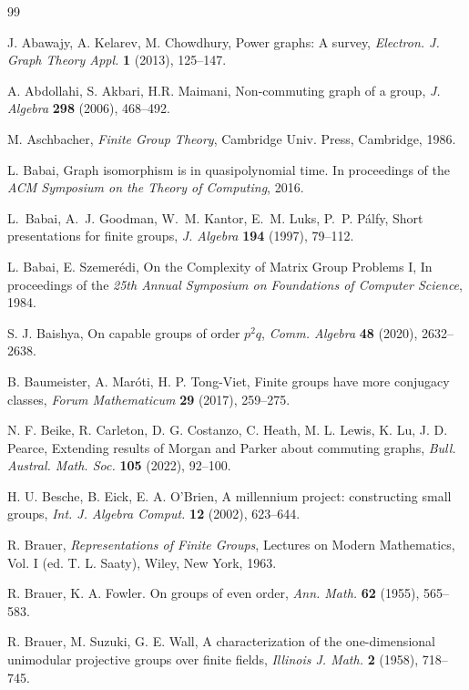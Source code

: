 \documentclass{elsarticle}
\begin{document}
\begin{thebibliography}{99}

J. Abawajy, A. Kelarev, M. Chowdhury,
Power graphs: A survey,
\textit{Electron. J. Graph Theory Appl.} \textbf{1} (2013), 125--147.

 A. Abdollahi, S. Akbari, H.R. Maimani,
Non-commuting graph of a group,
\textit{J. Algebra} \textbf{298} (2006), 468--492.

M. Aschbacher,
\textit{Finite Group Theory},
Cambridge Univ. Press, Cambridge, 1986.

L. Babai,
Graph isomorphism is in quasipolynomial time.
In proceedings of the \emph{ACM Symposium on the Theory of
  Computing}, 2016.

L.~Babai, A.~J. Goodman, W.~M. Kantor, E.~M. Luks, P.~P. P\'{a}lfy,
Short presentations for finite groups,
\textit{J. Algebra} \textbf{194} (1997), 79--112.

L. Babai, E. Szemer\'edi,
On the Complexity of Matrix Group Problems I,
In proceedings of the \emph{25th Annual Symposium on Foundations of Computer Science}, 1984.


S. J. Baishya,
On capable groups of order $p^2q$,
\textit{Comm. Algebra} \textbf{48} (2020), 2632--2638.

B. Baumeister, A. Mar\'oti, H. P. Tong-Viet,
Finite groups have more conjugacy classes,
\textit{Forum Mathematicum} \textbf{29} (2017), 259--275.

N. F. Beike, R. Carleton, D. G. Costanzo, C. Heath,  M. L. Lewis, K. Lu,
J. D. Pearce,
Extending results of Morgan and Parker about commuting graphs,
\textit{Bull. Austral. Math. Soc.} \textbf{105} (2022), 92--100.

H. U. Besche, B. Eick, E. A. O'Brien,
A millennium project: constructing small groups,
\textit{Int. J. Algebra Comput.} \textbf{12} (2002), 623--644.

R. Brauer,
\textit{Representations  of Finite Groups},
Lectures  on  Modern  Mathematics,  Vol.  I  (ed.  T. L. Saaty),
Wiley,  New  York,  1963.

R. Brauer, K. A. Fowler.
On groups of even order,
\textit{Ann. Math.} \textbf{62} (1955), 565--583.

R. Brauer, M. Suzuki, G. E. Wall,
A characterization of the one-dimensional unimodular projective groups over
finite fields,
\textit{Illinois J. Math.} \textbf{2} (1958), 718--745.


\end{thebibliography}
\end{document}
